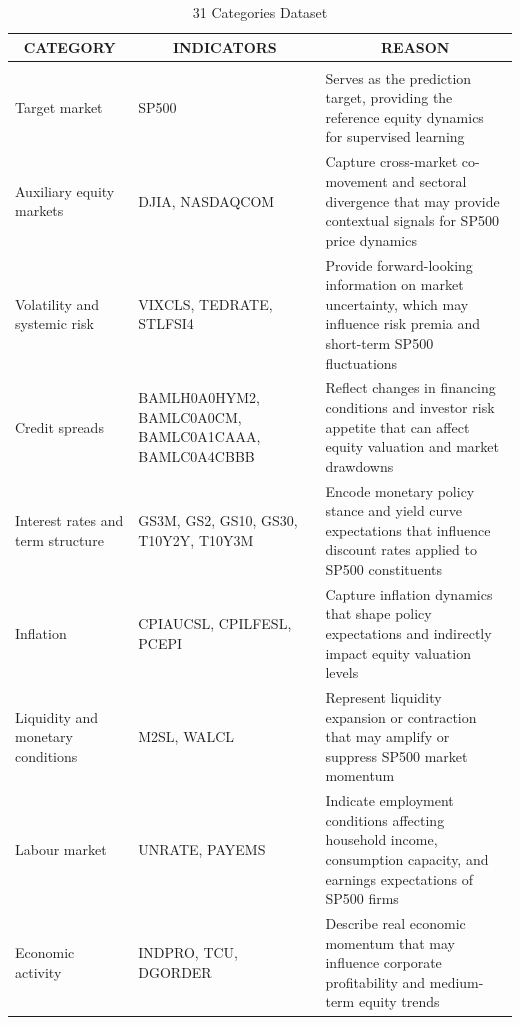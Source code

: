 \documentclass[10pt]{article} %
\begin{document}
\begin{table}[H]
\caption{31 Categories Dataset}
\label{tab:31_Categories_Dataset}
\begin{center}
\begin{tabular}{p{3.4cm} p{4.8cm} p{6.2cm}}
\multicolumn{1}{c}{\bf CATEGORY} &
\multicolumn{1}{c}{\bf INDICATORS} &
\multicolumn{1}{c}{\bf REASON}
\\ \hline \\

Target market
& SP500
& Serves as the prediction target, providing the reference equity dynamics for supervised learning \\[6pt]

Auxiliary equity markets
& DJIA, NASDAQCOM
& Capture cross-market co-movement and sectoral divergence that may provide contextual signals for SP500 price dynamics \\[6pt]

Volatility and systemic risk
& VIXCLS, TEDRATE, STLFSI4
& Provide forward-looking information on market uncertainty, which may influence risk premia and short-term SP500 fluctuations \\[6pt]

Credit spreads
& BAMLH0A0HYM2, BAMLC0A0CM, BAMLC0A1CAAA, BAMLC0A4CBBB
& Reflect changes in financing conditions and investor risk appetite that can affect equity valuation and market drawdowns \\[6pt]

Interest rates and term structure
& GS3M, GS2, GS10, GS30, T10Y2Y, T10Y3M
& Encode monetary policy stance and yield curve expectations that influence discount rates applied to SP500 constituents \\[6pt]

Inflation
& CPIAUCSL, CPILFESL, PCEPI
& Capture inflation dynamics that shape policy expectations and indirectly impact equity valuation levels \\[6pt]

Liquidity and monetary conditions
& M2SL, WALCL
& Represent liquidity expansion or contraction that may amplify or suppress SP500 market momentum \\[6pt]

Labour market
& UNRATE, PAYEMS
& Indicate employment conditions affecting household income, consumption capacity, and earnings expectations of SP500 firms \\[6pt]

Economic activity
& INDPRO, TCU, DGORDER
& Describe real economic momentum that may influence corporate profitability and medium-term equity trends \\[6pt]


\end{tabular}
\end{center}
\end{table}
\end{document}
